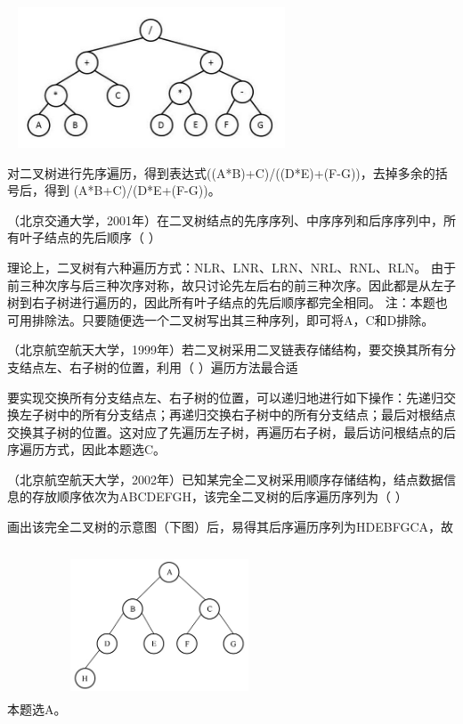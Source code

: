 ~
\includegraphics[width=3.12500in,height=1.64583in]{computerassets/529ae776b55a6057f6656794e91069ed.jpeg}
\par{}
\begin{solution}对二叉树进行先序遍历，得到表达式((A*B)+C)/((D*E)+(F-G))，去掉多余的括号后，得到
(A*B+C)/(D*E+(F-G))。
\end{solution}
\question （北京交通大学，2001年）在二叉树结点的先序序列、中序序列和后序序列中，所有叶子结点的先后顺序（
）
\par{}
\begin{solution}理论上，二叉树有六种遍历方式：NLR、LNR、LRN、NRL、RNL、RLN。
由于前三种次序与后三种次序对称，故只讨论先左后右的前三种次序。因此都是从左子树到右子树进行遍历的，因此所有叶子结点的先后顺序都完全相同。
注：本题也可用排除法。只要随便选一个二叉树写出其三种序列，即可将A，C和D排除。
\end{solution}
\question （北京航空航天大学，1999年）若二叉树采用二叉链表存储结构，要交换其所有分支结点左、右子树的位置，利用（
）遍历方法最合适
\par{}
\begin{solution}要实现交换所有分支结点左、右子树的位置，可以递归地进行如下操作：先递归交换左子树中的所有分支结点；再递归交换右子树中的所有分支结点；最后对根结点交换其子树的位置。这对应了先遍历左子树，再遍历右子树，最后访问根结点的后序遍历方式，因此本题选C。
\end{solution}
\question （北京航空航天大学，2002年）已知某完全二叉树采用顺序存储结构，结点数据信息的存放顺序依次为ABCDEFGH，该完全二叉树的后序遍历序列为（
）
\par{}
\begin{solution}画出该完全二叉树的示意图（下图）后，易得其后序遍历序列为HDEBFGCA，故本题选A。
\includegraphics[width=2.08333in,height=2.08333in]{computerassets/82999f59b924ff27710fe8094367a64b.jpeg}
\end{solution}
